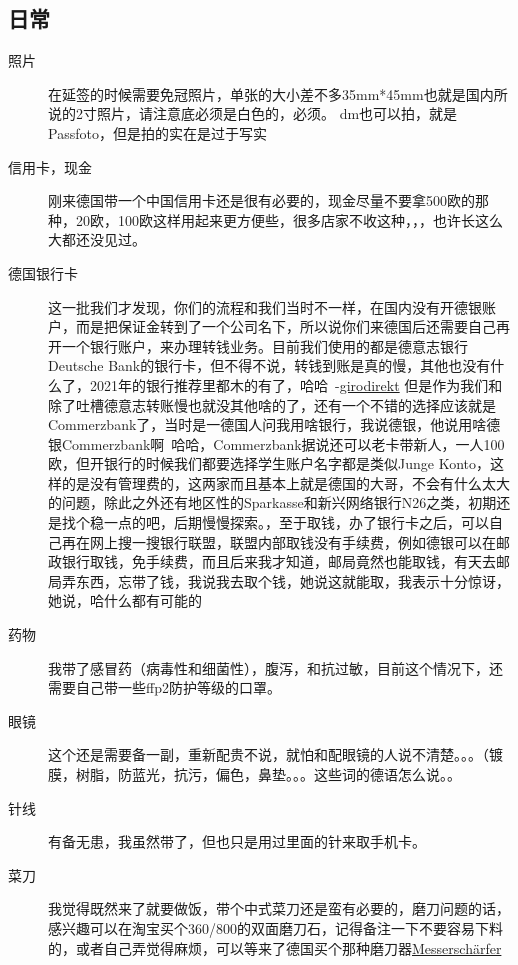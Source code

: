 \documentclass[doku.tex]{subfiles}
\begin{document}
	\subsection{日常}
\begin{description}
		\item[照片] \label{passforo}在延签的时候需要免冠照片，单张的大小差不多35mm*45mm也就是国内所说的2寸照片，请注意底必须是白色的，必须。 dm也可以拍，就是Passfoto，但是拍的实在是过于写实~
		\item[信用卡，现金] 刚来德国带一个中国信用卡还是很有必要的，现金尽量不要拿500欧的那种，20欧，100欧这样用起来更方便些，很多店家不收这种，，，也许长这么大都还没见过。
		\item[德国银行卡] 这一批我们才发现，你们的流程和我们当时不一样，在国内没有开德银账户，而是把保证金转到了一个公司名下，所以说你们来德国后还需要自己再开一个银行账户，来办理转钱业务。目前我们使用的都是德意志银行Deutsche Bank的银行卡，但不得不说，转钱到账是真的慢，其他也没有什么了，2021年的银行推荐里都木的有了，哈哈~-\href{https://www.girodirekt.com/}{girodirekt} 但是作为我们和除了吐槽德意志转账慢也就没其他啥的了，还有一个不错的选择应该就是Commerzbank了，当时是一德国人问我用啥银行，我说德银，他说用啥德银Commerzbank啊~哈哈，Commerzbank据说还可以老卡带新人，一人100欧，但开银行的时候我们都要选择学生账户名字都是类似Junge Konto，这样的是没有管理费的，这两家而且基本上就是德国的大哥，不会有什么太大的问题，除此之外还有地区性的Sparkasse和新兴网络银行N26之类，初期还是找个稳一点的吧，后期慢慢探索。\label{BankKonto}，至于取钱，办了银行卡之后，可以自己再在网上搜一搜银行联盟，联盟内部取钱没有手续费，例如德银可以在邮政银行取钱，免手续费，而且后来我才知道，邮局竟然也能取钱，有天去邮局弄东西，忘带了钱，我说我去取个钱，她说这就能取，我表示十分惊讶，她说，哈什么都有可能的~
		\item[药物] 我带了感冒药（病毒性和细菌性），腹泻，和抗过敏，目前这个情况下，还需要自己带一些ffp2防护等级的口罩。
		\item[眼镜] 这个还是需要备一副，重新配贵不说，就怕和配眼镜的人说不清楚。。。（镀膜，树脂，防蓝光，抗污，偏色，鼻垫。。。这些词的德语怎么说。。   
		\item[针线] 有备无患，我虽然带了，但也只是用过里面的针来取手机卡。
		\item[菜刀] 我觉得既然来了就要做饭，带个中式菜刀还是蛮有必要的，磨刀问题的话，感兴趣可以在淘宝买个360/800的双面磨刀石，记得备注一下不要容易下料的，或者自己弄觉得麻烦，可以等来了德国买个那种磨刀器\href{https://www.amazon.de/Limirror-Messersch%C3%A4rfer-Messerschleifer-Messerschaerfer-Vintage-Schwarz/dp/B08JQ5L7NY/ref=sr_1_7?__mk_de_DE=%C3%85M%C3%85%C5%BD%C3%95%C3%91&crid=2IX7ZZKQLY1KK&dchild=1&keywords=messer+versch%C3%A4rfer&qid=1612527983&sprefix=messer+vers%2Caps%2C186&sr=8-7}{Messerschärfer}

\end{description}
\end{document}
